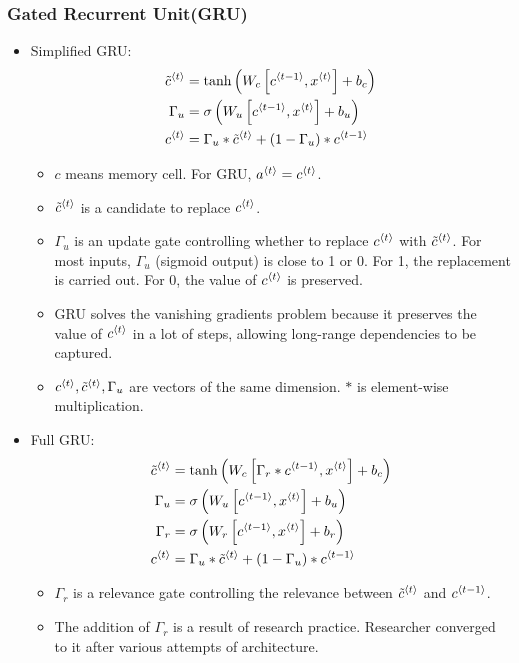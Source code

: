 \subsubsection{Gated Recurrent Unit(GRU)}
\begin{itemize}
  \item Simplified GRU: 
  \begin{align*}
    \tilde{c}^{\left\langle t\right\rangle}&=\tanh\left(W_c\left[c^{\left\langle t-1\right\rangle},x^{\left\langle t\right\rangle}\right]+b_c\right)\\
    \Gamma_u&=\sigma\left(W_u\left[c^{\left\langle t-1\right\rangle},x^{\left\langle t\right\rangle}\right]+b_u\right)\\
    c^{\left\langle t\right\rangle}&=\Gamma_u\ast \tilde{c}^{\left\langle t\right\rangle}+\left(1-\Gamma_u\right)\ast c^{\left\langle t-1\right\rangle}
  \end{align*}
  \begin{itemize}
    \item $c$ means memory cell. For GRU, $a^{\left\langle t\right\rangle}=c^{\left\langle t\right\rangle}$.
    \item $\tilde{c}^{\left\langle t\right\rangle}$ is a candidate to replace $c^{\left\langle t\right\rangle}$. 
    \item $\Gamma_u$ is an update gate controlling whether to replace $c^{\left\langle t\right\rangle}$ with $\tilde{c}^{\left\langle t\right\rangle}$. For most inputs, $\Gamma_u$ (sigmoid output) is close to 1 or 0. For 1, the replacement is carried out. For 0, the value of $c^{\left\langle t\right\rangle}$ is preserved. 
    \item GRU solves the vanishing gradients problem because it preserves the value of $c^{\left\langle t\right\rangle}$ in a lot of steps, allowing long-range dependencies to be captured.
    \item $c^{\left\langle t\right\rangle}, \tilde{c}^{\left\langle t\right\rangle}, \Gamma_u$ are vectors of the same dimension. $\ast$ is element-wise multiplication.
  \end{itemize}
  \item Full GRU:
  \begin{align*}
    \tilde{c}^{\left\langle t\right\rangle}&=\tanh\left(W_c\left[\Gamma_r\ast c^{\left\langle t-1\right\rangle},x^{\left\langle t\right\rangle}\right]+b_c\right)\\
    \Gamma_u&=\sigma\left(W_u\left[c^{\left\langle t-1\right\rangle},x^{\left\langle t\right\rangle}\right]+b_u\right)\\
    \Gamma_r&=\sigma\left(W_r\left[c^{\left\langle t-1\right\rangle},x^{\left\langle t\right\rangle}\right]+b_r\right)\\
    c^{\left\langle t\right\rangle}&=\Gamma_u\ast \tilde{c}^{\left\langle t\right\rangle}+\left(1-\Gamma_u\right)\ast c^{\left\langle t-1\right\rangle}
  \end{align*}
  \begin{itemize}
    \item $\Gamma_r$ is a relevance gate controlling the relevance between $\tilde{c}^{\left\langle t\right\rangle}$ and $c^{\left\langle t-1\right\rangle}$.
    \item The addition of $\Gamma_r$ is a result of research practice. Researcher converged to it after various attempts of architecture. 
  \end{itemize}
\end{itemize}
